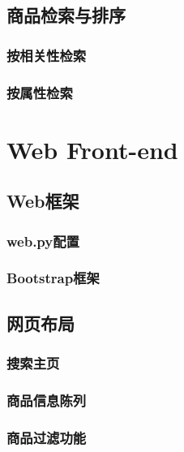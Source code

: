 
\chapter{商品检索与排序}

\section{按相关性检索}

\section{按属性检索}


\part{Web Front-end}

\chapter{Web框架}

\section{web.py配置}

\section{Bootstrap框架}


\chapter{网页布局}

\section{搜索主页}

\section{商品信息陈列}

\section{商品过滤功能}
